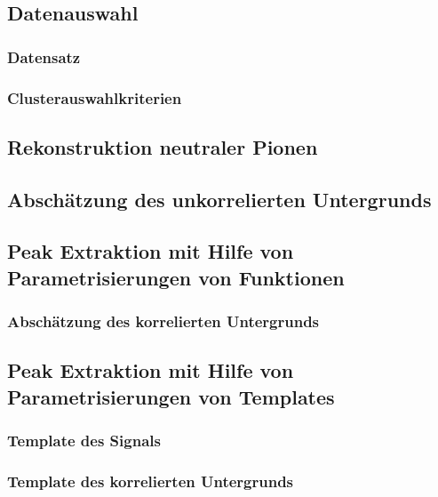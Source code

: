 \documentclass[11pt]{article}
\begin{document}
\subsection{Datenauswahl} \label{s3s1}

\subsubsection{Datensatz} \label{s3s1s1}

\subsubsection{Clusterauswahlkriterien} \label{s3s1s2}

\subsection{Rekonstruktion neutraler Pionen} \label{s3s2}


\subsection{Absch{\"a}tzung des unkorrelierten Untergrunds} \label{s3s3}

\subsection{Peak Extraktion mit Hilfe von Parametrisierungen von Funktionen} \label{s3s4}

\subsubsection{Absch{\"a}tzung des korrelierten Untergrunds} \label{s3s4s1}

\subsection{Peak Extraktion mit Hilfe von Parametrisierungen von Templates} \label{s3s5}

\subsubsection{Template des Signals} \label{s3s5s1}

\subsubsection{Template des korrelierten Untergrunds} \label{s3s5s2}
\end{document}
